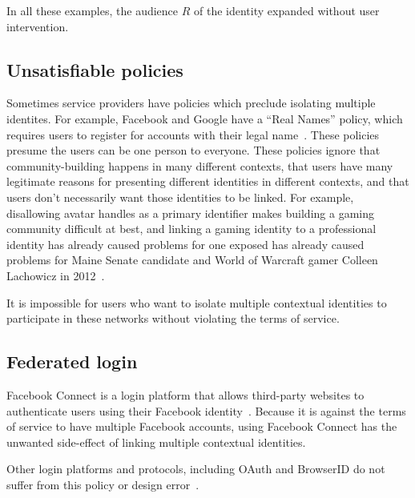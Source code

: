 \documentclass{llncs}
\begin{document}
In all these examples, the audience $R$ of the identity expanded without user
intervention.

\subsection{Unsatisfiable policies}
Sometimes service providers have policies which preclude isolating multiple
identites. For example, Facebook and Google have a ``Real Names'' policy, which
requires users to register for accounts with their legal
name~\cite{fb_names,google_names}.  These policies presume the users can be one
person to everyone. These policies ignore that community-building happens in
many different contexts, that users have many legitimate reasons for presenting
different identities in different contexts, and that users don't necessarily
want those identities to be linked. For example, disallowing avatar handles as
a primary identifier makes building a gaming community difficult at best, and
linking a gaming identity to a professional identity has already caused
problems for one exposed has already caused problems for Maine Senate candidate
and World of Warcraft gamer Colleen Lachowicz in 2012~\cite{maine}.

It is impossible for users who want to isolate multiple contextual identities
to participate in these networks without violating the terms of service.

\subsection{Federated login}
Facebook Connect is a login platform that allows third-party websites to
authenticate users using their Facebook identity~\cite{fb_connect}. Because it
is against the terms of service to have multiple Facebook accounts, using
Facebook Connect has the unwanted side-effect of linking multiple contextual
identities.

Other login platforms and protocols, including OAuth and BrowserID
do not suffer from this policy or design error~\cite{browserid,oauth}.
\begin{comment}
(TODO:
this is actually kinda complicated -- yahoo, twitter, google allow multiple
accounts but the multi-login support is broken at google, not sure how it is
with others, oauth protocol supports multiple accounts, persona clearly
supports multiple accounts)
\end{comment}
\end{document}
